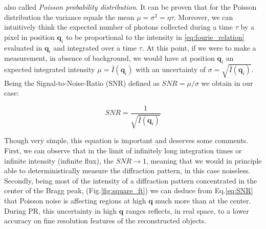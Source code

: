 also called \textit{Poisson probability distribution}. It can be proven that for the Poisson distribution 
the variance equals the mean $\mu = \sigma^2 = \eta \tau $. Moreover, we can intuitively think the expected number of photons 
collected during a time $\tau$ by a pixel in position $\mathbf{q}_i$ to be proportional to the intensity in \ref{eq:fourie_relation}
evaluated in $\mathbf{q}_i$ and integrated over a time $\tau$.
At this point, if we were to make a measurement, in absence of background, we would have at position $\mathbf{q}_i$ an 
expected integrated intensity $\mu = \bar{I}(\mathbf{q}_i)$ with an uncertainty of $ \sigma = \sqrt{\bar{I}(\mathbf{q}_i)}$. 
Being the Signal-to-Noise-Ratio (SNR) defined as $SNR = \mu / \sigma$ we obtain in our case: 

\begin{equation}
    SNR =  \frac{1}{\sqrt{\bar{I}(\mathbf{q}_i)}} 
    \label{eq:SNR}
\end{equation}

Though very simple, this equation is important and deserves some comments.
First, we can observe that in the limit of infinitely long integration times or infinite intensity (infinite flux), 
the $SNR \rightarrow 1$, meaning that we would in principle able to deterministically measure the diffraction pattern, 
in this case noiseless. Secondly, being most of the intensity of a diffraction 
pattern concentrated in the center of the Bragg peak, (Fig.\ref{fig:square_ft}) we can deduce from Eq.\ref{eq:SNR} that Poisson 
noise is affecting regions at high $\mathbf{q}$ much more than at the center. During PR, this uncertainty in high $\mathbf{q}$ ranges 
reflects, in real space, to a lower accuracy on fine resolution features of the reconstructed objects. 





